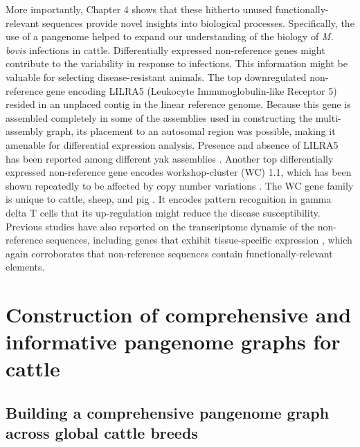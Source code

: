 \documentclass[../main.tex]{subfiles}
\begin{document}
More importantly, Chapter 4 shows that these hitherto unused functionally-relevant sequences provide novel insights into biological processes. Specifically, the use of a pangenome helped to expand our understanding of the biology of \emph{M. bovis} infections in cattle. Differentially expressed non-reference genes might contribute to the variability in response to infections. This information might be valuable for selecting disease-resistant animals. The top downregulated non-reference gene encoding LILRA5 (Leukocyte Immunoglobulin-like Receptor 5) resided in an unplaced contig in the linear reference genome. Because this gene is assembled completely in some of the assemblies used in constructing the multi-assembly graph, its placement to an autosomal region was possible, making it amenable for differential expression analysis. Presence and absence of LILRA5 has been reported among different yak assemblies \citep{ji2021chromosome}. Another top differentially expressed non-reference gene encodes workshop-cluster (WC) 1.1, which has been shown repeatedly to be affected by copy number variations \citep{liu2010analysis,chen2012gene,bickhart2012copy,Low2020}. The WC gene family is unique to cattle, sheep, and pig \citep{bickhart2014challenges}. It encodes pattern recognition in gamma delta T cells that its 
up-regulation might reduce the disease susceptibility. Previous studies have also reported on the transcriptome dynamic of the non-reference sequences, including genes that exhibit tissue-specific expression \citep{wong2018novo,wong2020towards,li2019towards}, which again corroborates that non-reference sequences contain functionally-relevant elements. 

\section[Construction of comprehensive and informative pangenome graphs for cattle]{Construction of comprehensive and informative pangenome graphs for cattle}

\subsection*{Building a comprehensive pangenome graph across global cattle breeds}
\end{document}
